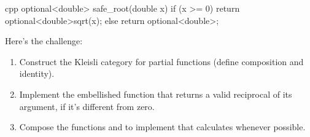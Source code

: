 \begin{snip}{cpp}
optional<double> safe_root(double x) {
    if (x >= 0) return optional<double>{sqrt(x)}; 
    else return optional<double>{};
}
\end{snip}
Here's the challenge:

\begin{enumerate}
\tightlist
\item
  Construct the Kleisli category for partial functions (define
  composition and identity).
\item
  Implement the embellished function  that
  returns a valid reciprocal of its argument, if it's different from
  zero.
\item
  Compose the functions  and  to implement
   that calculates 
  whenever possible.
\end{enumerate}
